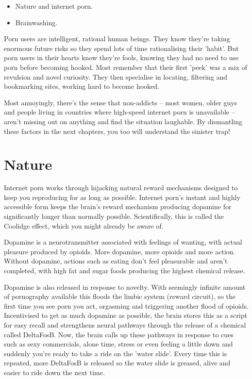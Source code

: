 \documentclass[
]{book}
\begin{document}
\begin{itemize}
\item
  Nature and internet porn.
\item
  Brainwashing.
\end{itemize}

Porn users are intelligent, rational human beings. They know they're taking enormous future risks so they spend lots of time rationalising their 'habit'. But porn users in their hearts know they're fools, knowing they had no need to use porn before becoming hooked. Most remember that their first 'peek' was a mix of revulsion and novel curiosity. They then specialise in locating, filtering and bookmarking sites, working hard to become hooked.

Most annoyingly, there's the sense that non-addicts -- most women, older guys and people living in countries where high-speed internet porn is unavailable -- aren't missing out on anything and find the situation laughable. By dismantling these factors in the next chapters, you too will understand the sinister trap!

\hypertarget{nature}{%
\chapter{Nature}\label{nature}}

Internet porn works through hijacking natural reward mechanisms designed to keep you reproducing for as long as possible. Internet porn's instant and highly accessible form keeps the brain's reward mechanism producing dopamine for significantly longer than normally possible. Scientifically, this is called the Coolidge effect, which you might already be aware of.

Dopamine is a neurotransmitter associated with feelings of wanting, with actual pleasure produced by opioids. More dopamine, more opioids and more action. Without dopamine, actions such as eating don't feel pleasurable and aren't completed, with high fat and sugar foods producing the highest chemical release.

Dopamine is also released in response to novelty. With seemingly infinite amount of pornography available this floods the limbic system (reward circuit), so the first time you see porn you act, orgasming and triggering another flood of opioids. Incentivised to get as much dopamine as possible, the brain stores this as a script for easy recall and strengthens neural pathways through the release of a chemical called DeltaFosB. Now, the brain calls up these pathways in response to cues such as sexy commercials, alone time, stress or even feeling a little down and suddenly you're ready to take a ride on the 'water slide'. Every time this is repeated, more DeltaFosB is released so the water slide is greased, alive and easier to ride down the next time.
\end{document}
